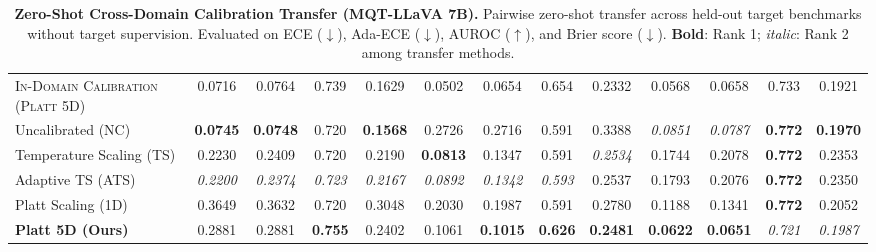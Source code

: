 \begin{table}[t]
{\begin{tabular}{l cccc cccc cccc}
\midrule
\textsc{In-Domain Calibration (Platt 5D)} & 0.0716 & 0.0764 & 0.739 & 0.1629 & 0.0502 & 0.0654 & 0.654 & 0.2332 & 0.0568 & 0.0658 & 0.733 & 0.1921 \\
Uncalibrated (NC) & \textbf{0.0745} & \textbf{0.0748} & 0.720 & \textbf{0.1568} & 0.2726 & 0.2716 & 0.591 & 0.3388 & \textit{0.0851} & \textit{0.0787} & \textbf{0.772} & \textbf{0.1970} \\
Temperature Scaling (TS) & 0.2230 & 0.2409 & 0.720 & 0.2190 & \textbf{0.0813} & 0.1347 & 0.591 & \textit{0.2534} & 0.1744 & 0.2078 & \textbf{0.772} & 0.2353 \\
Adaptive TS (ATS) & \textit{0.2200} & \textit{0.2374} & \textit{0.723} & \textit{0.2167} & \textit{0.0892} & \textit{0.1342} & \textit{0.593} & 0.2537 & 0.1793 & 0.2076 & \textbf{0.772} & 0.2350 \\
Platt Scaling (1D) & 0.3649 & 0.3632 & 0.720 & 0.3048 & 0.2030 & 0.1987 & 0.591 & 0.2780 & 0.1188 & 0.1341 & \textbf{0.772} & 0.2052 \\
\textbf{Platt 5D (Ours)} & 0.2881 & 0.2881 & \textbf{0.755} & 0.2402 & 0.1061 & \textbf{0.1015} & \textbf{0.626} & \textbf{0.2481} & \textbf{0.0622} & \textbf{0.0651} & \textit{0.721} & \textit{0.1987} \\
\bottomrule
\end{tabular}%
}
\caption{\textbf{Zero-Shot Cross-Domain Calibration Transfer (MQT-LLaVA 7B).} Pairwise zero-shot transfer across held-out target benchmarks without target supervision. Evaluated on ECE ($\downarrow$), Ada-ECE ($\downarrow$), AUROC ($\uparrow$), and Brier score ($\downarrow$). \textbf{Bold}: Rank 1; \textit{italic}: Rank 2 among transfer methods.}
\label{tab:table3_mqt_transfer}
\end{table}
